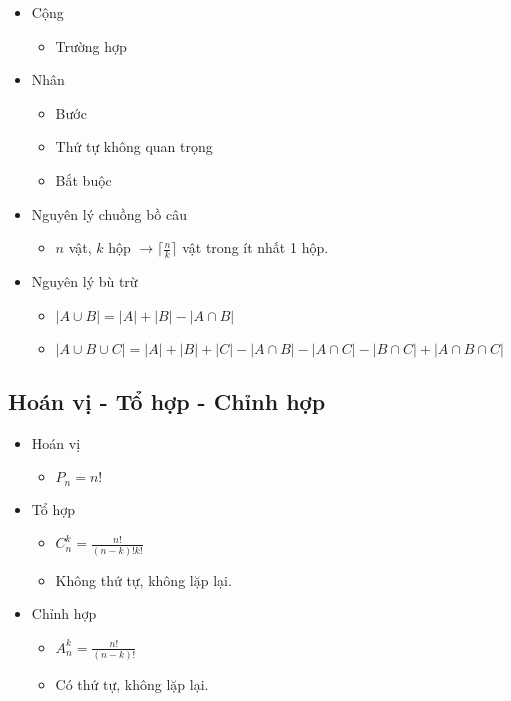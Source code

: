 \documentclass[11pt]{article}
\providecommand{\tightlist}{%
      \setlength{\itemsep}{0pt}\setlength{\parskip}{0pt}}
\begin{document}
    \begin{itemize}
\item
  Cộng

  \begin{itemize}
  \tightlist
  \item
    Trường hợp
  \end{itemize}
\item
  Nhân

  \begin{itemize}
  \item
    Bước
  \item
    Thứ tự không quan trọng
  \item
    Bắt buộc
  \end{itemize}
\item
  Nguyên lý chuồng bồ câu

  \begin{itemize}
  \tightlist
  \item
    \(n\) vật, \(k\) hộp \(\to \lceil \frac{n}{k} \rceil\) vật trong ít
    nhất 1 hộp.
  \end{itemize}
\item
  Nguyên lý bù trừ

  \begin{itemize}
  \item
    \(|A \cup B| = |A| + |B| - |A \cap B|\)
  \item
    \(|A \cup B \cup C| = |A| + |B| + |C| - |A \cap B| - |A \cap C| - |B \cap C| + |A \cap B \cap C |\)
  \end{itemize}
\end{itemize}

    \subsection{Hoán vị - Tổ hợp - Chỉnh
hợp}\label{houxe1n-vux1ecb---tux1ed5-hux1ee3p---chux1ec9nh-hux1ee3p}

    \begin{itemize}
\item
  Hoán vị

  \begin{itemize}
  \tightlist
  \item
    \(P_n=n!\)
  \end{itemize}
\item
  Tổ hợp

  \begin{itemize}
  \item
    \(C_n^k = \frac{n!}{(n-k)!k!}\)
  \item
    Không thứ tự, không lặp lại.
  \end{itemize}
\item
  Chỉnh hợp

  \begin{itemize}
  \item
    \(A_n^k = \frac{n!}{(n-k)!}\)
  \item
    Có thứ tự, không lặp lại.
  \end{itemize}
\end{itemize}
\end{document}
